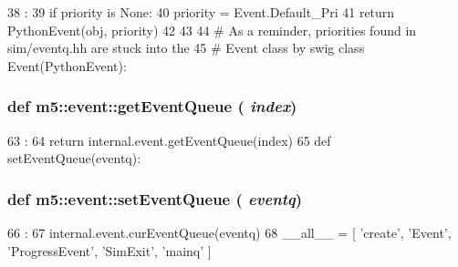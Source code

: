 \begin{DoxyCode}
38                               :
39     if priority is None:
40         priority = Event.Default_Pri
41     return PythonEvent(obj, priority)
42 
43 
44 # As a reminder, priorities found in sim/eventq.hh are stuck into the
45 # Event class by swig
class Event(PythonEvent):
\end{DoxyCode}
\hypertarget{namespacem5_1_1event_ad99027ec643e20cbd3364b65c1ad8604}{
\subsubsection[{getEventQueue}]{\setlength{\rightskip}{0pt plus 5cm}def m5::event::getEventQueue ( {\em index})}}
\label{namespacem5_1_1event_ad99027ec643e20cbd3364b65c1ad8604}



\begin{DoxyCode}
63                         :
64     return internal.event.getEventQueue(index)
65 
def setEventQueue(eventq):
\end{DoxyCode}
\hypertarget{namespacem5_1_1event_aac381d168909de61426d8757834e53a9}{
\subsubsection[{setEventQueue}]{\setlength{\rightskip}{0pt plus 5cm}def m5::event::setEventQueue ( {\em eventq})}}
\label{namespacem5_1_1event_aac381d168909de61426d8757834e53a9}



\begin{DoxyCode}
66                          :
67     internal.event.curEventQueue(eventq)
68 
__all__ = [ 'create', 'Event', 'ProgressEvent', 'SimExit', 'mainq' ]
\end{DoxyCode}



